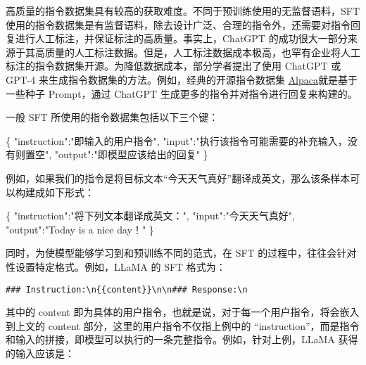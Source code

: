 \documentclass[
]{article}
\newenvironment{Shaded}{}{}
\newcommand{\DataTypeTok}[1]{\textcolor[rgb]{0.56,0.13,0.00}{#1}}
\newcommand{\FunctionTok}[1]{\textcolor[rgb]{0.02,0.16,0.49}{#1}}
\newcommand{\StringTok}[1]{\textcolor[rgb]{0.25,0.44,0.63}{#1}}
\begin{document}
高质量的指令数据集具有较高的获取难度。不同于预训练使用的无监督语料，SFT
使用的指令数据集是有监督语料，除去设计广泛、合理的指令外，还需要对指令回复进行人工标注，并保证标注的高质量。事实上，ChatGPT
的成功很大一部分来源于其高质量的人工标注数据。但是，人工标注数据成本极高，也罕有企业将人工标注的指令数据集开源。为降低数据成本，部分学者提出了使用
ChatGPT 或 GPT-4 来生成指令数据集的方法。例如，经典的开源指令数据集
\href{https://github.com/yizhongw/self-instruct/blob/main/human_eval/user_oriented_instructions.jsonl}{Alpaca}就是基于一些种子
Prompt，通过 ChatGPT 生成更多的指令并对指令进行回复来构建的。

一般 SFT 所使用的指令数据集包括以下三个键：

\begin{Shaded}
\begin{Highlighting}[]
\FunctionTok{\{}
    \DataTypeTok{"instruction"}\FunctionTok{:}\StringTok{"即输入的用户指令"}\FunctionTok{,}
    \DataTypeTok{"input"}\FunctionTok{:}\StringTok{"执行该指令可能需要的补充输入，没有则置空"}\FunctionTok{,}
    \DataTypeTok{"output"}\FunctionTok{:}\StringTok{"即模型应该给出的回复"}
\FunctionTok{\}}
\end{Highlighting}
\end{Shaded}

例如，如果我们的指令是将目标文本``今天天气真好''翻译成英文，那么该条样本可以构建成如下形式：

\begin{Shaded}
\begin{Highlighting}[]
\FunctionTok{\{}
    \DataTypeTok{"instruction"}\FunctionTok{:}\StringTok{"将下列文本翻译成英文："}\FunctionTok{,}
    \DataTypeTok{"input"}\FunctionTok{:}\StringTok{"今天天气真好"}\FunctionTok{,}
    \DataTypeTok{"output"}\FunctionTok{:}\StringTok{"Today is a nice day！"}
\FunctionTok{\}}
\end{Highlighting}
\end{Shaded}

同时，为使模型能够学习到和预训练不同的范式，在 SFT
的过程中，往往会针对性设置特定格式。例如，LLaMA 的 SFT 格式为：

\begin{verbatim}
### Instruction:\n{{content}}\n\n### Response:\n
\end{verbatim}

其中的 content
即为具体的用户指令，也就是说，对于每一个用户指令，将会嵌入到上文的
content 部分，这里的用户指令不仅指上例中的
``instruction''，而是指令和输入的拼接，即模型可以执行的一条完整指令。例如，针对上例，LLaMA
获得的输入应该是：
\end{document}
